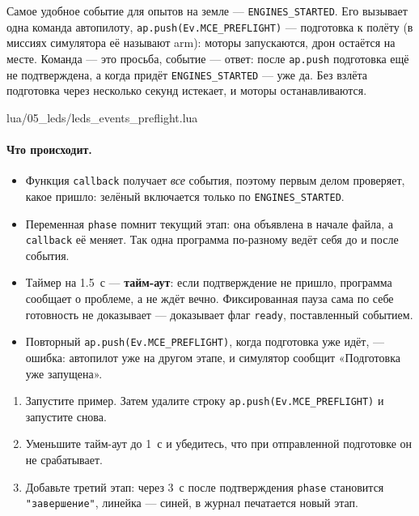 Самое удобное событие для опытов на земле --- \verb|ENGINES_STARTED|. Его вызывает одна команда автопилоту, \verb|ap.push(Ev.MCE_PREFLIGHT)| --- подготовка к полёту (в миссиях симулятора её называют arm): моторы запускаются, дрон остаётся на месте. Команда --- это просьба, событие --- ответ: после \verb|ap.push| подготовка ещё не подтверждена, а когда придёт \verb|ENGINES_STARTED| --- уже да. Без взлёта подготовка через несколько секунд истекает, и моторы останавливаются.

\begin{codefile}{lua/05_leds/leds_events_preflight.lua}
\end{codefile}

\paragraph{Что происходит.}
\begin{itemize}
    \item Функция \verb|callback| получает \emph{все} события, поэтому первым делом проверяет, какое пришло: зелёный включается только по \verb|ENGINES_STARTED|.
    \item Переменная \verb|phase| помнит текущий этап: она объявлена в начале файла, а \verb|callback| её меняет. Так одна программа по-разному ведёт себя до и после события.
    \item Таймер на 1.5~с --- \textbf{тайм-аут}: если подтверждение не пришло, программа сообщает о проблеме, а не ждёт вечно. Фиксированная пауза сама по себе готовность не доказывает --- доказывает флаг \verb|ready|, поставленный событием.
    \item Повторный \verb|ap.push(Ev.MCE_PREFLIGHT)|, когда подготовка уже идёт, --- ошибка: автопилот уже на другом этапе, и симулятор сообщит «Подготовка уже запущена».
\end{itemize}

\begin{taskbox}
\begin{enumerate}
  \item Запустите пример. Затем удалите строку \verb|ap.push(Ev.MCE_PREFLIGHT)| и запустите снова.
  \item Уменьшите тайм-аут до 1~с и убедитесь, что при отправленной подготовке он не срабатывает.
  \item Добавьте третий этап: через 3~с после подтверждения \verb|phase| становится \verb|"завершение"|, линейка --- синей, в журнал печатается новый этап.
\end{enumerate}
\end{taskbox}

